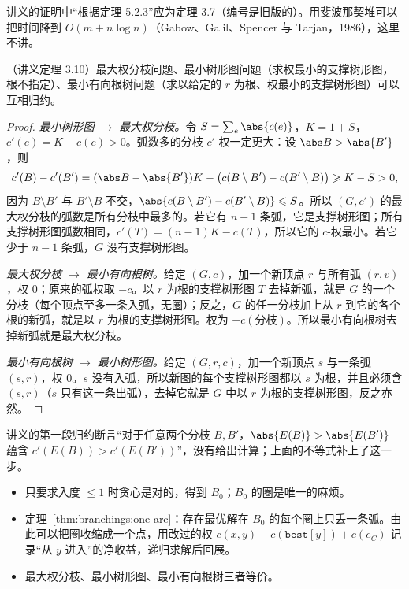 讲义的证明中“根据定理 5.2.3”应为定理 3.7（编号是旧版的）。用斐波那契堆可以把时间降到 $O(m+n\log n)$（Gabow、Galil、Spencer 与 Tarjan，1986），这里不讲。


\begin{theorem}\label{thm:branchings:equivalent}
（讲义定理 3.10）最大权分枝问题、最小树形图问题（求权最小的支撑树形图，根不指定）、最小有向根树问题（求以给定的 $r$ 为根、权最小的支撑树形图）可以互相归约。
\end{theorem}
\begin{proof}
\emph{最小树形图 $\to$ 最大权分枝。}令 $S=\sum_e\abs{c(e)}$，$K=1+S$，$c'(e)=K-c(e)>0$。弧数多的分枝 $c'$-权一定更大：设 $\abs B>\abs{B'}$，则
\[
c'(B)-c'(B')=(\abs B-\abs{B'})K-\bigl(c(B\setminus B')-c(B'\setminus B)\bigr)\geqslant K-S>0,
\]
因为 $B\setminus B'$ 与 $B'\setminus B$ 不交，$\abs{c(B\setminus B')-c(B'\setminus B)}\leqslant S$。所以 $(G,c')$ 的最大权分枝的弧数是所有分枝中最多的。若它有 $n-1$ 条弧，它是支撑树形图；所有支撑树形图弧数相同，$c'(T)=(n-1)K-c(T)$，所以它的 $c$-权最小。若它少于 $n-1$ 条弧，$G$ 没有支撑树形图。

\emph{最大权分枝 $\to$ 最小有向根树。}给定 $(G,c)$，加一个新顶点 $r$ 与所有弧 $(r,v)$，权 $0$；原来的弧权取 $-c$。以 $r$ 为根的支撑树形图 $T$ 去掉新弧，就是 $G$ 的一个分枝（每个顶点至多一条入弧，无圈）；反之，$G$ 的任一分枝加上从 $r$ 到它的各个根的新弧，就是以 $r$ 为根的支撑树形图。权为 $-c(\text{分枝})$。所以最小有向根树去掉新弧就是最大权分枝。

\emph{最小有向根树 $\to$ 最小树形图。}给定 $(G,r,c)$，加一个新顶点 $s$ 与一条弧 $(s,r)$，权 $0$。$s$ 没有入弧，所以新图的每个支撑树形图都以 $s$ 为根，并且必须含 $(s,r)$（$s$ 只有这一条出弧），去掉它就是 $G$ 中以 $r$ 为根的支撑树形图，反之亦然。
\end{proof}

讲义的第一段归约断言“对于任意两个分枝 $B,B'$，$\abs{E(B)}>\abs{E(B')}$ 蕴含 $c'(E(B))>c'(E(B'))$”，没有给出计算；上面的不等式补上了这一步。


\begin{itemize}
\item 只要求入度 $\leqslant1$ 时贪心是对的，得到 $B_0$；$B_0$ 的圈是唯一的麻烦。
\item 定理~\ref{thm:branchings:one-arc}：存在最优解在 $B_0$ 的每个圈上只丢一条弧。由此可以把圈收缩成一个点，用改过的权 $c(x,y)-c(\texttt{best}[y])+c(e_C)$ 记录“从 $y$ 进入”的净收益，递归求解后回展。
\item 最大权分枝、最小树形图、最小有向根树三者等价。
\end{itemize}

